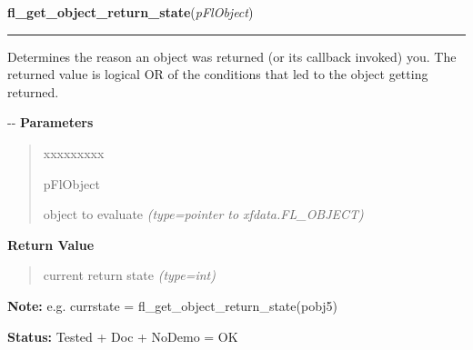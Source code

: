 \hspace{.8\funcindent}\begin{boxedminipage}{\funcwidth}

    \raggedright \textbf{fl\_get\_object\_return\_state}(\textit{pFlObject})

    \vspace{-1.5ex}

    \rule{\textwidth}{0.5\fboxrule}
\setlength{\parskip}{2ex}

Determines the reason an object was returned (or its callback invoked)
you. The returned value is logical OR of the conditions that led to the
object getting returned.

-{}-
\setlength{\parskip}{1ex}
      \textbf{Parameters}
      \vspace{-1ex}

      \begin{quote}
        \begin{Ventry}{xxxxxxxxx}

          \item[pFlObject]


object to evaluate
            {\it (type=pointer to xfdata.FL\_OBJECT)}

        \end{Ventry}

      \end{quote}

      \textbf{Return Value}
    \vspace{-1ex}

      \begin{quote}

current return state
      {\it (type=int)}

      \end{quote}

\textbf{Note:} 
e.g. currstate = fl\_get\_object\_return\_state(pobj5)


\textbf{Status:} 
Tested + Doc + NoDemo = OK


    \end{boxedminipage}

    \label{xformslib:flbasic:fl_trigger_object}

    \vspace{0.5ex}

